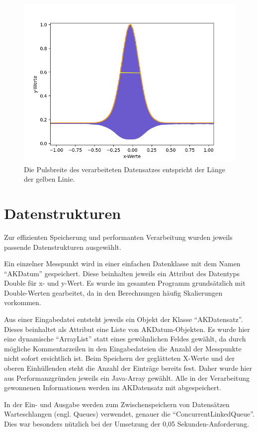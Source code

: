 \begin{figure}[htb]
    \centering
    \includegraphics[width=0.7\linewidth]{images/Pulsbreite}
    \caption{
        Die Pulsbreite des verarbeiteten Datensatzes entspricht der Länge der gelben Linie.
    }
    \label{fig:pulsbreite}
\end{figure}

\section{Datenstrukturen}\label{sec:datenstrukt}
Zur effizienten Speicherung und performanten Verarbeitung wurden jeweils passende Datenstrukturen ausgewählt.

Ein einzelner Messpunkt wird in einer einfachen Datenklasse mit dem Namen \enquote{AKDatum} gespeichert.
Diese beinhalten jeweils ein Attribut des Datentyps Double für x- und y-Wert.
Es wurde im gesamten Programm grundsätzlich mit Double-Werten gearbeitet, da in den Berechnungen häufig Skalierungen vorkommen.

Aus einer Eingabedatei entsteht jeweils ein Objekt der Klasse \enquote{AKDatensatz}.
Dieses beinhaltet als Attribut eine Liste von AKDatum-Objekten.
Es wurde hier eine dynamische \enquote{ArrayList} statt eines gewöhnlichen Feldes gewählt, da durch mögliche Kommentarzeilen in den Eingabedateien die Anzahl der Messpunkte nicht sofort ersichtlich ist.
Beim Speichern der geglätteten X-Werte und der oberen Einhüllenden steht die Anzahl der Einträge bereits fest.
Daher wurde hier aus Performanzgründen jeweils ein Java-Array gewählt.
Alle in der Verarbeitung gewonnenen Informationen werden im AKDatensatz mit abgespeichert.

In der Ein- und Ausgabe werden zum Zwischenspeichern von Datensätzen Warteschlangen (engl. Queues) verwendet, genauer die \enquote{ConcurrentLinkedQueue}.
Dies war besonders nützlich bei der Umsetzung der 0,05 Sekunden-Anforderung.




